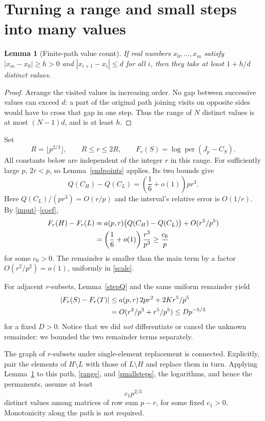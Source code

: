 \documentclass[11pt,a4paper]{article}
\newcommand{\per}{\operatorname{per}}
\newtheorem{lemma}[theorem]{Lemma}
\begin{document}
\section{Turning a range and small steps into many values}
\begin{lemma}[Finite-path value count]\label{path}
If real numbers $x_0,\ldots,x_m$ satisfy $|x_m-x_0|\ge h>0$ and $|x_{i+1}-x_i|\le d$ for all $i$, then they take at least $1+h/d$ distinct values.
\end{lemma}
\begin{proof}
Arrange the visited values in increasing order. No gap between successive values can exceed $d$: a part of the original path joining visits on opposite sides would have to cross that gap in one step. Thus the range of $N$ distinct values is at most $(N-1)d$, and is at least $h$.
\end{proof}

Set
\begin{equation}\label{scale}
 R=\lfloor p^{2/3}\rfloor,\qquad R\le r\le2R,
 \qquad F_r(S)=\log\per(J_p-C_S).
\end{equation}
All constants below are independent of the integer $r$ in this range. For sufficiently large $p$, $2r<p$, so Lemma~\ref{endpoints} applies. Its two bounds give
\[
 Q(C_H)-Q(C_L)=\left(\frac16+o(1)\right)pr^3.
\]
Here $Q(C_L)/(pr^3)=O(r/p)$ and the interval's relative error is $O(1/r)$. By \eqref{input}--\eqref{coef},
\begin{align}
 F_r(H)-F_r(L)
 &=a(p,r)\bigl(Q(C_H)-Q(C_L)\bigr)+O(r^5/p^5)\notag\\
 &=\left(\frac16+o(1)\right)\frac{r^3}{p^3}
 \ge\frac{c_0}{p}\label{range}
\end{align}
for some $c_0>0$. The remainder is smaller than the main term by a factor $O(r^2/p^2)=o(1)$, uniformly in \eqref{scale}.

For adjacent $r$-subsets, Lemma~\ref{stepQ} and the same uniform remainder yield
\begin{align}
 |F_r(S)-F_r(T)|
 &\le a(p,r)\,2pr^2+2Kr^5/p^5\notag\\
 &=O(r^2/p^3+r^5/p^5)
 \le Dp^{-5/3}\label{smallsteps}
\end{align}
for a fixed $D>0$. Notice that we did \emph{not} differentiate or cancel the unknown remainder: we bounded the two remainder terms separately.

The graph of $r$-subsets under single-element replacement is connected. Explicitly, pair the elements of $H\setminus L$ with those of $L\setminus H$ and replace them in turn. Applying Lemma~\ref{path} to this path, \eqref{range}, and \eqref{smallsteps}, the logarithms, and hence the permanents, assume at least
\begin{equation}\label{perdegree}
 c_1p^{2/3}
\end{equation}
distinct values among matrices of row sum $p-r$, for some fixed $c_1>0$. Monotonicity along the path is not required.
\end{document}
